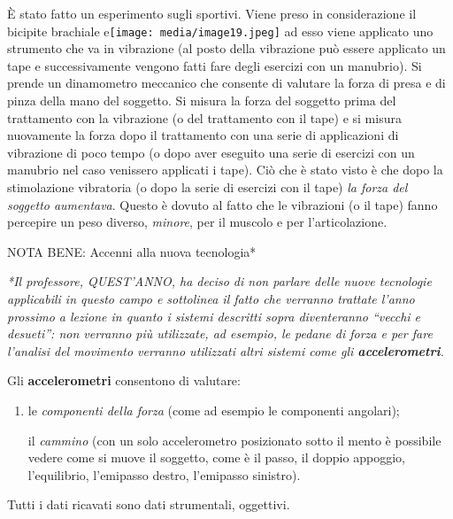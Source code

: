 \documentclass[]{article}
\begin{document}
È stato fatto un esperimento sugli sportivi. Viene preso in
considerazione il bicipite brachiale
e\texttt{[image: media/image19.jpeg]}
ad esso viene applicato uno strumento che va in vibrazione (al posto
della vibrazione può essere applicato un tape e successivamente vengono
fatti fare degli esercizi con un manubrio). Si prende un dinamometro
meccanico che consente di valutare la forza di presa e di pinza della
mano del soggetto. Si misura la forza del soggetto prima del trattamento
con la vibrazione (o del trattamento con il tape) e si misura nuovamente
la forza dopo il trattamento con una serie di applicazioni di vibrazione
di poco tempo (o dopo aver eseguito una serie di esercizi con un
manubrio nel caso venissero applicati i tape). Ciò che è stato visto è
che dopo la stimolazione vibratoria (o dopo la serie di esercizi con il
tape) \emph{la forza del soggetto aumentava}. Questo è dovuto al fatto
che le vibrazioni (o il tape) fanno percepire un peso diverso,
\emph{minore}, per il muscolo e per l'articolazione.

NOTA BENE: Accenni alla nuova tecnologia*

\emph{*Il professore, QUEST'ANNO, ha deciso di non parlare delle nuove
tecnologie applicabili in questo campo e sottolinea il fatto che
verranno trattate l'anno prossimo a lezione in quanto i sistemi
descritti sopra diventeranno ``\emph{vecchi e desueti''}: non verranno
più utilizzate, ad esempio, le pedane di forza e per fare l'analisi del
movimento verranno utilizzati altri sistemi come gli
\textbf{accelerometri}.}

Gli \textbf{accelerometri} consentono di valutare:

\begin{enumerate}
\def\labelenumi{\arabic{enumi}.}
\item
  le \emph{componenti della forza} (come ad esempio le componenti
  angolari);

  il \emph{cammino} (con un solo accelerometro posizionato sotto il
  mento è possibile vedere come si muove il soggetto, come è il passo,
  il doppio appoggio, l'equilibrio, l'emipasso destro, l'emipasso
  sinistro).
\end{enumerate}

Tutti i dati ricavati sono dati strumentali, oggettivi.
\end{document}
